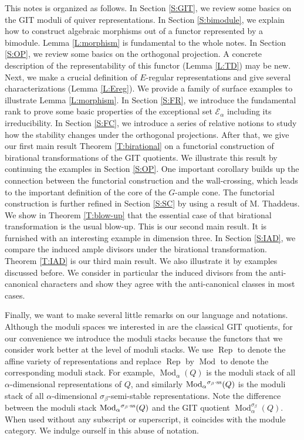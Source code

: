 \documentclass{amsart}
\theoremstyle{definition}
\theoremstyle{remark}
\numberwithin{equation}{section}
\begin{document}
This notes is organized as follows. In Section \ref{S:GIT}, we review some basics on the GIT moduli of quiver representations.
In Section \ref{S:bimodule}, we explain how to construct algebraic morphisms out of a functor represented by a bimodule. Lemma \ref{L:morphism} is fundamental to the whole notes.
In Section \ref{S:OP}, we review some basics on the orthogonal projection. A concrete description of the representability of this functor (Lemma \ref{L:TD}) may be new. Next, we make a crucial definition of $E$-regular representations and give several characterizations (Lemma \ref{L:Ereg}). We provide a family of surface examples to illustrate Lemma \ref{L:morphism}.
In Section \ref{S:FR}, we introduce the fundamental rank to prove some basic properties of the exceptional set ${\mathcal{{E}}}_\alpha$ including its irreducibility.
In Section \ref{S:FC}, we introduce a series of relative notions to study how the stability changes under the orthogonal projections. After that, we give our first main result Theorem \ref{T:birational} on a functorial construction of birational transformations of the GIT quotients. We illustrate this result by continuing the examples in Section \ref{S:OP}.
One important corollary builds up the connection between the functorial construction and the wall-crossing, which leads to the important definition of the core of the $G$-ample cone.
The functorial construction is further refined in Section \ref{S:SC} by using a result of M. Thaddeus. We show in Theorem \ref{T:blow-up} that the essential case of that birational transformation is the usual blow-up. This is our second main result. It is furnished with an interesting example in dimension three.
In Section \ref{S:IAD}, we compare the induced ample divisors under the birational transformation. Theorem \ref{T:IAD} is our third main result. We also illustrate it by examples discussed before. We consider in particular the induced divisors from the anti-canonical characters and show they agree with the anti-canonical classes in most cases.

Finally, we want to make several little remarks on our language and notations. Although the moduli spaces we interested in are the classical GIT quotients, for our convenience we introduce the moduli stacks because the functors that we consider work better at the level of moduli stacks. We use ${\operatorname{Rep}}$ to denote the affine variety of representations and replace ${\operatorname{Rep}}$ by ${\operatorname{Mod}}$ to denote the corresponding moduli stack. For example, ${\operatorname{Mod}}_\alpha(Q)$ is the moduli stack of all $\alpha$-dimensional representations of $Q$, and similarly ${\operatorname{Mod}}_\alpha{^{\sigma_{{\beta}}\cdot{\rm {ss}}}}(Q)$ is the moduli stack of all $\alpha$-dimensional $\sigma_\beta$-semi-stable representations. Note the difference between the moduli stack ${\operatorname{Mod}}_\alpha{^{\sigma_{{\beta}}\cdot{\rm {ss}}}}(Q)$ and the GIT quotient ${\operatorname{Mod}}_\alpha^{\sigma_\beta}(Q)$. When used without any subscript or superscript, it coincides with the module category. We indulge ourself in this abuse of notation.
\end{document}
